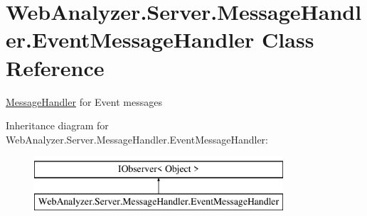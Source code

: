 \hypertarget{class_web_analyzer_1_1_server_1_1_message_handler_1_1_event_message_handler}{}\section{Web\+Analyzer.\+Server.\+Message\+Handler.\+Event\+Message\+Handler Class Reference}
\label{class_web_analyzer_1_1_server_1_1_message_handler_1_1_event_message_handler}


\hyperlink{namespace_web_analyzer_1_1_server_1_1_message_handler}{Message\+Handler} for Event messages  


Inheritance diagram for Web\+Analyzer.\+Server.\+Message\+Handler.\+Event\+Message\+Handler\+:\begin{figure}[H]
\begin{center}
\leavevmode
\includegraphics[height=2.000000cm]{class_web_analyzer_1_1_server_1_1_message_handler_1_1_event_message_handler}
\end{center}
\end{figure}
